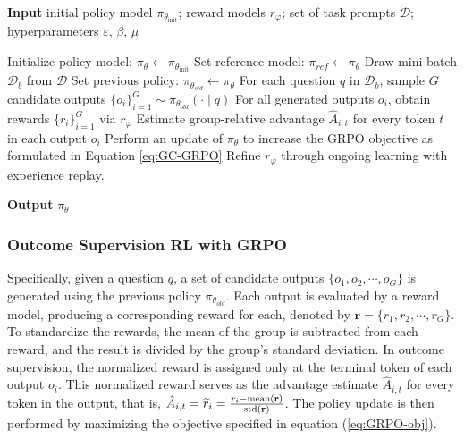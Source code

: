 \begin{itemize}[topsep=0pt]
\begin{algorithm}[t]
  \small
  \caption{Iterative Group Relative Policy Optimization}
  \textbf{Input} initial policy model $\pi_{\theta_{\text{init}}}$; reward models $r_\varphi$; set of task prompts $\mathcal{D}$; 
  hyperparameters $\varepsilon$, $\beta$, $\mu$
  \begin{algorithmic}[1]
    \State Initialize policy model: $\pi_\theta \leftarrow \pi_{\theta_{\text{init}}}$
       \State Set reference model: $\pi_{ref} \leftarrow \pi_{\theta}$
      \State Draw mini-batch $\mathcal{D}_b$ from $\mathcal{D}$
      \State Set previous policy: $\pi_{\theta_{old}} \leftarrow \pi_{\theta}$ 
      \State For each question $q$ in $\mathcal{D}_b$, sample $G$ candidate outputs $\{o_i\}_{i=1}^G \sim \pi_{\theta_{old}} (\cdot \mid q) $
      \State For all generated outputs $o_i$, obtain rewards $\{r_i\}_{i=1}^{G}$ via $r_{\varphi}$ 
      \State Estimate group-relative advantage $\hat{A}_{i,t}$ for every token $t$ in each output $o_i$
        \State Perform an update of $\pi_{\theta}$ to increase the GRPO objective as formulated in Equation \ref{eq:GC-GRPO}
      \EndFor
    \EndFor
    \State Refine $r_\varphi$ through ongoing learning with experience replay. 
    \EndFor 
  \end{algorithmic}
  \textbf{Output} $\pi_\theta$
  \label{alg:iter-grpo}
\end{algorithm}

\subsubsection{Outcome Supervision RL with GRPO} Specifically, given a question $q$, a set of candidate outputs $\{o_1, o_2, \cdots, o_G\}$ is generated using the previous policy $\pi_{\theta_{old}}$. Each output is evaluated by a reward model, producing a corresponding reward for each, denoted by $\mathbf{r}=\{r_1, r_2, \cdots, r_G\}$. To standardize the rewards, the mean of the group is subtracted from each reward, and the result is divided by the group's standard deviation. In outcome supervision, the normalized reward is assigned only at the terminal token of each output $o_i$. This normalized reward serves as the advantage estimate $\hat{A}_{i, t}$ for every token in the output, that is, $\hat{A}_{i, t} = \widetilde{r}_i = \frac{r_i- {\rm mean}(\mathbf{r})}{{\rm std}(\mathbf{r})}$. The policy update is then performed by maximizing the objective specified in equation (\ref{eq:GRPO-obj}).


\end{itemize}
